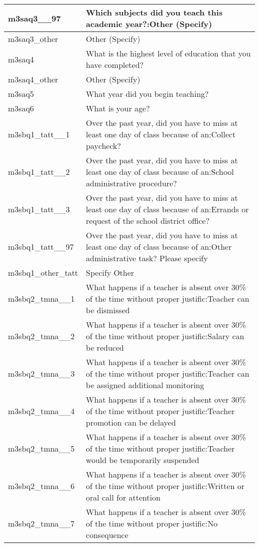 \documentclass[
]{article}
\begin{document}
\begin{table}
\begin{tabular}[t]{l|l}
\hline
m3saq3\_\_97 & Which subjects did you teach this academic year?:Other (Specify)\\
\hline
m3saq3\_other & Other (Specify)\\
\hline
m3saq4 & What is the highest level of education that you have completed?\\
\hline
m3saq4\_other & Other (Specify)\\
\hline
m3saq5 & What year did you begin teaching?\\
\hline
m3saq6 & What is your age?\\
\hline
m3sbq1\_tatt\_\_1 & Over the past year, did you have to miss at least one day of class because of an:Collect paycheck?\\
\hline
m3sbq1\_tatt\_\_2 & Over the past year, did you have to miss at least one day of class because of an:School administrative procedure?\\
\hline
m3sbq1\_tatt\_\_3 & Over the past year, did you have to miss at least one day of class because of an:Errands or request of the school district office?\\
\hline
m3sbq1\_tatt\_\_97 & Over the past year, did you have to miss at least one day of class because of an:Other administrative task? Please specify\\
\hline
m3sbq1\_other\_tatt & Specify Other\\
\hline
m3sbq2\_tmna\_\_1 & What happens if a teacher is absent over 30\% of the time without proper justific:Teacher can be dismissed\\
\hline
m3sbq2\_tmna\_\_2 & What happens if a teacher is absent over 30\% of the time without proper justific:Salary can be reduced\\
\hline
m3sbq2\_tmna\_\_3 & What happens if a teacher is absent over 30\% of the time without proper justific:Teacher can be assigned additional monitoring\\
\hline
m3sbq2\_tmna\_\_4 & What happens if a teacher is absent over 30\% of the time without proper justific:Teacher promotion can be delayed\\
\hline
m3sbq2\_tmna\_\_5 & What happens if a teacher is absent over 30\% of the time without proper justific:Teacher would be temporarily suspended\\
\hline
m3sbq2\_tmna\_\_6 & What happens if a teacher is absent over 30\% of the time without proper justific:Written or oral call for attention\\
\hline
m3sbq2\_tmna\_\_7 & What happens if a teacher is absent over 30\% of the time without proper justific:No consequence\\

\end{tabular}
\end{table}
\end{document}

